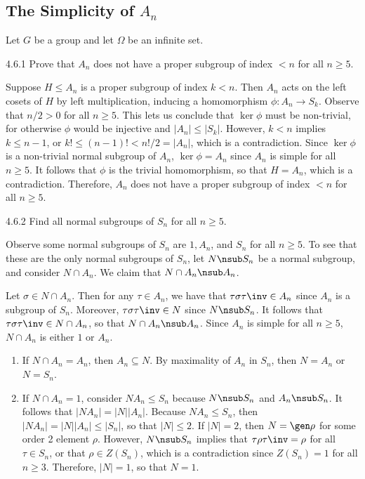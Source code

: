 \subsection{\texorpdfstring{The Simplicity of $A_n$}{The Simplicity of An}}

Let $G$ be a group and let $\Omega$ be an infinite set.

\begin{exercise}{4.6.1}
	Prove that $A_n$ does not have a proper subgroup of index $< n$ for all $n \geq 5$.
\end{exercise}

\begin{sol}
	Suppose $H \leq A_n$ is a proper subgroup of index $k < n$.
	Then $A_n$ acts on the left cosets of $H$ by left multiplication, inducing a homomorphism $\phi : A_n \to S_k$.
	Observe that $n/2 > 0$ for all $n \geq 5$.
	This lets us conclude that $\ker\phi$ must be non-trivial, for otherwise $\phi$ would be injective and $|A_n| \leq |S_k|$.
	However, $k < n$ implies $k \leq n - 1$, or $k! \leq (n - 1)! < n!/2 = |A_n|$, which is a contradiction.
	Since $\ker\phi$ is a non-trivial normal subgroup of $A_n$, $\ker\phi = A_n$ since $A_n$ is simple for all $n \geq 5$.
	It follows that $\phi$ is the trivial homomorphism, so that $H = A_n$, which is a contradiction.
	Therefore, $A_n$ does not have a proper subgroup of index $< n$ for all $n \geq 5$.
\end{sol}

\begin{exercise}{4.6.2}
	Find all normal subgroups of $S_n$ for all $n \geq 5$.
\end{exercise}

\begin{sol}
	Observe some normal subgroups of $S_n$ are $1, A_n$, and $S_n$ for all $n \geq 5$.
	To see that these are the only normal subgroups of $S_n$, let $N \nsub S_n$ be a normal subgroup, and consider $N \cap A_n$.
	We claim that $N \cap A_n \nsub A_n$.

	Let $\sigma \in N \cap A_n$.
	Then for any $\tau \in A_n$, we have that $\tau \sigma \tau\inv \in A_n$ since $A_n$ is a subgroup of $S_n$.
	Moreover, $\tau \sigma \tau\inv \in N$ since $N \nsub S_n$.
	It follows that $\tau \sigma \tau\inv \in N \cap A_n$, so that $N \cap A_n \nsub A_n$.
	Since $A_n$ is simple for all $n \geq 5$, $N \cap A_n$ is either $1$ or $A_n$.
	\begin{enumerate}
		\item If $N \cap A_n = A_n$, then $A_n \subseteq N$.
	By maximality of $A_n$ in $S_n$, then $N = A_n$ or $N = S_n$.
		\item If $N \cap A_n = 1$, consider $NA_n \leq S_n$ because $N \nsub S_n$ and $A_n \nsub S_n$.
	It follows that $|NA_n| = |N||A_n|$.
	Because $NA_n \leq S_n$, then $|NA_n| = |N||A_n| \leq |S_n|$, so that $|N| \leq 2$.
	If $|N| = 2$, then $N = \gen\rho$ for some order 2 element $\rho$.
	However, $N \nsub S_n$ implies that $\tau\rho\tau\inv = \rho$ for all $\tau \in S_n$, or that $\rho \in Z(S_n)$, which is a contradiction since $Z(S_n) = 1$ for all $n \geq 3$.
	Therefore, $|N| = 1$, so that $N = 1$. \qedhere
	\end{enumerate}
\end{sol}


